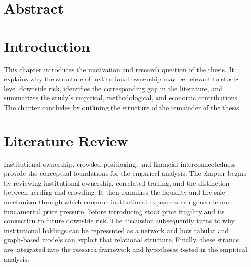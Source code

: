 \documentclass[12pt,a4paper]{report}
\begin{document}
\hypersetup{pageanchor=false}

\begin{onehalfspace}

    

\end{onehalfspace}

\hypersetup{pageanchor=true}


%

\chapter*{Abstract}


%

\tableofcontents

\clearpage
{}

\chapter{Introduction}
\label{chap:introduction}

This chapter introduces the motivation and research question of the thesis. It explains why the structure of institutional ownership may be relevant to stock-level downside risk, identifies the corresponding gap in the literature, and summarizes the study's empirical, methodological, and economic contributions. The chapter concludes by outlining the structure of the remainder of the thesis.






\chapter{Literature Review}
\label{chap:literature_review}

Institutional ownership, crowded positioning, and financial interconnectedness provide the conceptual foundations for the empirical analysis. The chapter begins by reviewing institutional ownership, correlated trading, and the distinction between herding and crowding. It then examines the liquidity and fire-sale mechanism through which common institutional exposures can generate non-fundamental price pressure, before introducing stock price fragility and its connection to future downside risk. The discussion subsequently turns to why institutional holdings can be represented as a network and how tabular and graph-based models can exploit that relational structure. Finally, these strands are integrated into the research framework and hypotheses tested in the empirical analysis.
\end{document}
